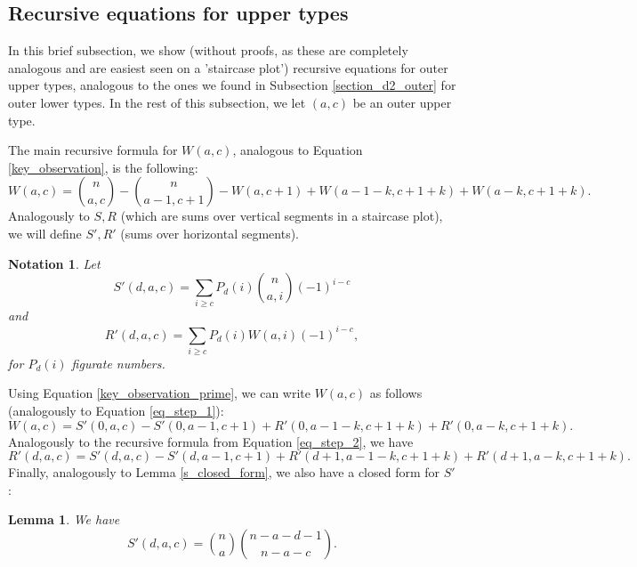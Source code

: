 \documentclass[11pt, reqno]{amsart}
\newtheorem{lemma}[theorem]{Lemma}
\newtheorem*{notation}{Notation}
\numberwithin{equation}{section}
\begin{document}
\subsection{Recursive equations for upper types}

In this brief subsection, we show (without proofs, as these are completely analogous and are easiest seen on a 'staircase plot') recursive equations for outer upper types, analogous to the ones we found in Subsection \ref{section_d2_outer} for outer lower types. In the rest of this subsection, we let $(a, c)$ be an outer upper type.

The main recursive formula for $W(a, c)$, analogous to Equation \ref{key_observation}, is the following:
\begin{equation}
\label{key_observation_prime}
    W(a, c) = \binom{n}{a, c} - \binom{n}{a-1, c+1} - W(a, c+1) + W(a - 1 - k, c + 1 + k) + W(a - k, c + 1 + k).
\end{equation}
Analogously to $S, R$ (which are sums over vertical segments in a staircase plot), we will define $S', R'$ (sums over horizontal segments).
\begin{notation}
    Let
    \begin{equation*}
        S'(d, a, c) = \sum_{i \geqslant c} P_d(i) \binom{n}{a, i} (-1)^{i-c}
    \end{equation*}
    and
    \begin{equation*}
        R'(d, a, c) = \sum_{i \geqslant c} P_d(i) W(a, i) (-1)^{i-c},
    \end{equation*}
    for $P_d(i)$ figurate numbers.
\end{notation}
Using Equation \ref{key_observation_prime}, we can write $W(a, c)$ as follows (analogously to Equation \ref{eq_step_1}):
\begin{equation}
\label{eq_step_1_prime}
    W(a, c) = S'(0, a, c) - S'(0, a-1, c+1) + R'(0, a-1-k, c+1+k) + R'(0, a-k, c+1+k).
\end{equation}
Analogously to the recursive formula from Equation \ref{eq_step_2}, we have
\begin{equation*}
\label{eq_step_2_prime}
    R'(d, a, c) = S'(d, a, c) - S'(d, a-1, c+1) + R'(d+1, a-1-k, c+1+k) + R'(d+1, a-k, c+1+k).
\end{equation*}
Finally, analogously to Lemma \ref{s_closed_form}, we also have a closed form for $S'$:
\begin{lemma}
\label{s_closed_form_prime}
    We have
    \begin{equation*}
        S'(d, a, c) = \binom{n}{a} \binom{n-a-d-1}{n-a-c}.
    \end{equation*}
\end{lemma}
\end{document}
